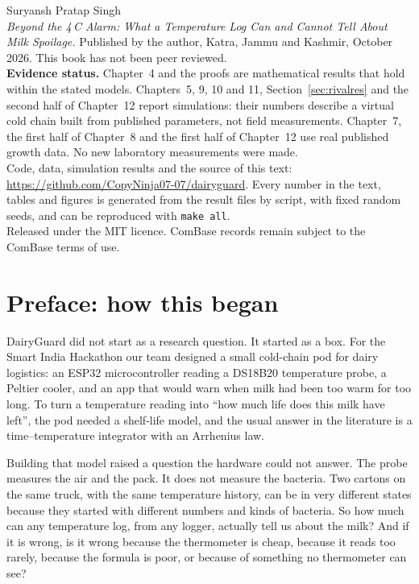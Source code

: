 \documentclass[11pt,a4paper,twoside,openany]{book}
\theoremstyle{plain}\newtheorem{proposition}{Proposition}\newtheorem{corollary}{Corollary}
\theoremstyle{definition}\newtheorem{definition}{Definition}[chapter]
\begin{document}
\frontmatter


\thispagestyle{empty}
\vspace*{\fill}
{\small\noindent Suryansh Pratap Singh\\
\textit{Beyond the 4\,\textdegree C Alarm: What a Temperature Log Can and Cannot Tell About Milk Spoilage.} Published by the author, Katra, Jammu and Kashmir, October 2026. This book has not been peer reviewed.\\[6pt]
\textbf{Evidence status.} Chapter~4 and the proofs are mathematical results that hold within the stated models. Chapters~5, 9, 10 and 11, Section~\ref{sec:rivalres} and the second half of Chapter~12 report simulations: their numbers describe a virtual cold chain built from published parameters, not field measurements. Chapter~7, the first half of Chapter~8 and the first half of Chapter~12 use real published growth data. No new laboratory measurements were made.\\[6pt]
Code, data, simulation results and the source of this text: \url{https://github.com/CopyNinja07-07/dairyguard}. Every number in the text, tables and figures is generated from the result files by script, with fixed random seeds, and can be reproduced with \texttt{make all}.\\[6pt]
Released under the MIT licence. ComBase records remain subject to the ComBase terms of use.\par}


\chapter*{Preface: how this began}
DairyGuard did not start as a research question. It started as a box. For the Smart India Hackathon our team designed a small cold-chain pod for dairy logistics: an ESP32 microcontroller reading a DS18B20 temperature probe, a Peltier cooler, and an app that would warn when milk had been too warm for too long. To turn a temperature reading into ``how much life does this milk have left'', the pod needed a shelf-life model, and the usual answer in the literature is a time--temperature integrator with an Arrhenius law.

Building that model raised a question the hardware could not answer. The probe measures the air and the pack. It does not measure the bacteria. Two cartons on the same truck, with the same temperature history, can be in very different states because they started with different numbers and kinds of bacteria. So how much can any temperature log, from any logger, actually tell us about the milk? And if it is wrong, is it wrong because the thermometer is cheap, because it reads too rarely, because the formula is poor, or because of something no thermometer can see?
\end{document}
